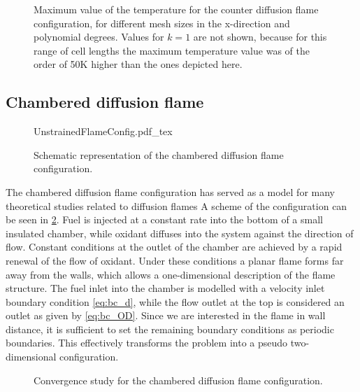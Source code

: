 \begin{figure}[tbp]
	\centering
	\caption{Maximum value of the temperature for the counter diffusion flame configuration, for different mesh sizes in the x-direction and polynomial degrees. Values for $k=1$ are not shown, because for this range of cell lengths the maximum temperature value was of the order of 50K higher than the ones depicted here.}
	\label{fig:TemperatureConvergenceDiffFlame}
\end{figure}
\FloatBarrier
\newpage
\subsection{Chambered diffusion flame}\label{ss:UDF}
\begin{figure}[b]
	\begin{center}
		\def\svgwidth{0.8\textwidth}
		{UnstrainedFlameConfig.pdf_tex}		
		\caption{Schematic representation of the chambered diffusion flame configuration. }
\label{fig:chamberedDifFlame}
	\end{center}	
\end{figure} 

The chambered diffusion flame configuration has served as a model for many theoretical studies related to diffusion flames\cite{matalonEffectThermalExpansion2010,rameauNumericalBifurcationChambered1985,matalonDiffusionFlamesChamber1980} A scheme of the configuration can be seen in \cref{fig:chamberedDifFlame}. Fuel is injected at a constant rate into the bottom of a small insulated chamber, while oxidant diffuses into the system against the direction of flow. Constant conditions at the outlet of the chamber are achieved by a rapid renewal of the flow of oxidant.  Under these conditions a planar flame forms far away from the walls, which allows a one-dimensional description of the flame structure.
The fuel inlet into the chamber is modelled with a velocity inlet boundary condition \cref{eq:bc_d}, while the flow outlet at the top is considered an outlet as given by \cref{eq:bc_OD}. Since we are interested in the flame in wall distance, it is sufficient to set the remaining boundary conditions as periodic boundaries. This effectively transforms the problem into a pseudo two-dimensional configuration. 


\begin{figure}[t!]
	\centering
	\pgfplotsset{width=0.34\textwidth, compat=1.3}
	\caption{Convergence study for the chambered diffusion flame configuration.}
	\label{ConvergenceDiffFlame}
\end{figure}

